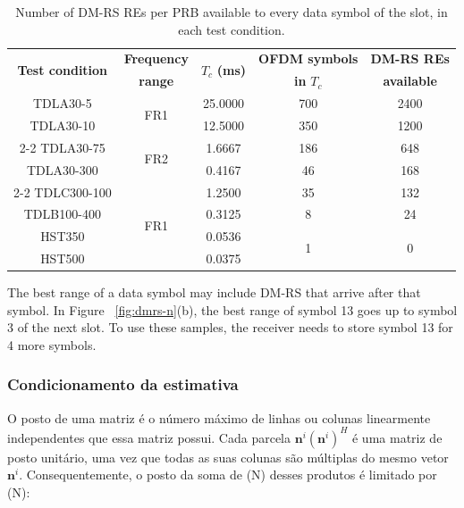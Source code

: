 \begin{table}[htbp]
\caption{Number of DM-RS REs per PRB available to every data symbol of the slot, in each test condition.}
\label{tab:n-maximo}
\vspace{4pt} %
\centering
\footnotesize
\renewcommand{\arraystretch}{1.2}
\setlength{\aboverulesep}{0pt}
\setlength{\belowrulesep}{0pt}
\begin{tabular}{|c|c|c|c|c|}
\toprule
\multirow{2}{*}{\textbf{Test condition}} & \textbf{Frequency} & \multirow{2}{*}{{\boldmath $T_c$} \textbf{(ms)}} & \textbf{OFDM symbols} & \textbf{DM-RS REs} \\
 & \textbf{range} & & \textbf{in} {\boldmath $T_c$} & \textbf{available} \\
\midrule
TDLA30-5    & \multirow{2}{*}{FR1} & 25.0000 & 700 & 2400 \\
TDLA30-10   &                      & 12.5000 & 350 & 1200 \\
\cline{2-2}
TDLA30-75   & \multirow{2}{*}{FR2} & 1.6667  & 186 & 648 \\
TDLA30-300  &                      & 0.4167  & 46  & 168 \\
\cline{2-2}
TDLC300-100 & \multirow{4}{*}{FR1} & 1.2500  & 35  & 132 \\
TDLB100-400 &                      & 0.3125  & 8   & 24 \\
HST350      &                      & 0.0536  & \multirow{2}{*}{1} & \multirow{2}{*}{0} \\
HST500      &                      & 0.0375  &     &  \\
\bottomrule
\end{tabular}
\vspace{4pt}
\end{table}

The best range of a data symbol may include DM-RS that arrive after that symbol. In Figure ~\ref{fig:dmrs-n}(b), the best range of symbol 13 goes up to symbol 3 of the next slot. To use these samples, the receiver needs to store symbol 13 for 4 more symbols.



\subsubsection{Condicionamento da estimativa}\label{subsubsec:condicionamento-R}
O posto de uma matriz é o número máximo de linhas ou colunas linearmente independentes que essa matriz possui.  Cada parcela $\mathbf{n}^i(\mathbf{n}^i)^H$ é uma matriz de posto unitário, uma vez que todas as suas colunas são múltiplas do mesmo vetor $\mathbf{n}^i$. Consequentemente, o posto da soma de (N) desses produtos é limitado por (N):

